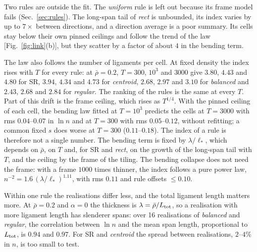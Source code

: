 \documentclass[aps,pre,twocolumn,superscriptaddress,amsmath,amssymb,floatfix]{revtex4-2}
\begin{document}
Two rules are outside the fit. The \emph{uniform} rule is left out because its frame model
fails (Sec.~\ref{sec:rules}). The long-span tail of \emph{rect} is unbounded, its index varies
by up to $7\times$ between directions, and a direction average is a poor summary. Its cells
stay below their own pinned ceilings and follow the trend of the law
[Fig.~\ref{fig:link}(b)], but they scatter by a factor of about $4$ in the bending term.

The law also follows the number of ligaments per cell. At fixed density the index rises with
$T$ for every rule: at $\bar\rho=0.2$, $T=300$, $10^3$ and $3000$ give $3.80$, $4.43$ and
$4.80$ for SR, $3.94$, $4.34$ and $4.73$ for \emph{centroid}, $2.68$, $2.97$ and $3.10$ for
\emph{balanced} and $2.43$, $2.68$ and $2.84$ for \emph{regular}. The ranking of the rules
is the same at every $T$. Part of this drift is the frame ceiling, which rises as $T^{1/4}$.
With the pinned ceiling of each cell, the bending law fitted at $T=10^3$ predicts the cells
at $T=3000$ with rms $0.04$--$0.07$ in $\ln n$ and at $T=300$ with rms $0.05$--$0.12$,
without refitting; a common fixed $s$ does worse at $T=300$ ($0.11$--$0.18$). The index of a
rule is therefore not a single number. The bending term is fixed by $\lambda/\ell_*$, which
depends on $\bar\rho$, on $T$ and, for SR and \emph{rect}, on the growth of the long-span
tail with $T$, and the ceiling by the frame of the tiling. The bending collapse does not
need the frame: with a frame $1000$ times thinner, the index follows a pure power law,
$n^{-2}=1.6\,(\lambda/\ell_*)^{1.11}$, with rms $0.11$ and rule offsets $\le0.10$.

Within one rule the realisations differ less, and the total ligament length matters
more. At $\bar\rho=0.2$ and $\alpha=0$ the thickness is $\lambda=\bar\rho/L_{\rm tot}$, so
a realisation with more ligament length has slenderer spans: over 16 realisations of
\emph{balanced} and \emph{regular}, the correlation between $\ln n$ and the mean span
length, proportional to $L_{\rm tot}$, is $0.94$ and $0.97$. For SR and \emph{centroid} the
spread between realisations, $2$--$4\%$ in $n$, is too small to test.
\end{document}
